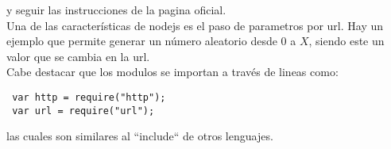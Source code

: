 y seguir las instrucciones de la pagina oficial.\\

Una de las características de nodejs es el paso de parametros por url. Hay un ejemplo que
permite generar un número aleatorio desde 0 a $X$, siendo este un valor que se cambia en la url.\\

Cabe destacar que los modulos se importan a través de lineas como:
\begin{verbatim}
 var http = require("http");
 var url = require("url");
\end{verbatim}
las cuales son similares al ``include`` de otros lenguajes.


